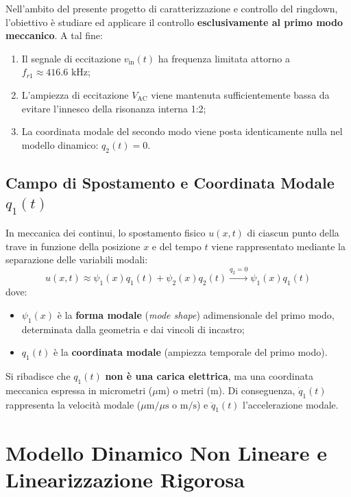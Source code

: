 \documentclass[11pt,a4paper]{article}
\begin{document}
\begin{notebox}
Nell'ambito del presente progetto di caratterizzazione e controllo del ringdown, l'obiettivo è studiare ed applicare il controllo \textbf{esclusivamente al primo modo meccanico}. A tal fine:
\begin{enumerate}
    \item Il segnale di eccitazione $v_{\text{in}}(t)$ ha frequenza limitata attorno a $f_{r1} \approx 416.6\text{ kHz}$;
    \item L'ampiezza di eccitazione $V_{\text{AC}}$ viene mantenuta sufficientemente bassa da evitare l'innesco della risonanza interna 1:2;
    \item La coordinata modale del secondo modo viene posta identicamente nulla nel modello dinamico: $q_2(t) = 0$.
\end{enumerate}
\end{notebox}

\subsection{Campo di Spostamento e Coordinata Modale \texorpdfstring{$q_1(t)$}{q1(t)}}
In meccanica dei continui, lo spostamento fisico $u(x,t)$ di ciascun punto della trave in funzione della posizione $x$ e del tempo $t$ viene rappresentato mediante la separazione delle variabili modali:
\begin{equation}
    u(x,t) \approx \psi_1(x) q_1(t) + \psi_2(x) q_2(t) \xrightarrow{q_2=0} \psi_1(x) q_1(t)
    \label{eq:field_displacement}
\end{equation}
dove:
\begin{itemize}
    \item $\psi_1(x)$ è la \textbf{forma modale} (\emph{mode shape}) adimensionale del primo modo, determinata dalla geometria e dai vincoli di incastro;
    \item $q_1(t)$ è la \textbf{coordinata modale} (ampiezza temporale del primo modo).
\end{itemize}
Si ribadisce che $q_1(t)$ \textbf{non è una carica elettrica}, ma una coordinata meccanica espressa in micrometri ($\mu\text{m}$) o metri ($\text{m}$). Di conseguenza, $\dot{q}_1(t)$ rappresenta la velocità modale ($\mu\text{m}/\mu\text{s}$ o $\text{m/s}$) e $\ddot{q}_1(t)$ l'accelerazione modale.

\newpage

\section{Modello Dinamico Non Lineare e Linearizzazione Rigorosa}
\end{document}
